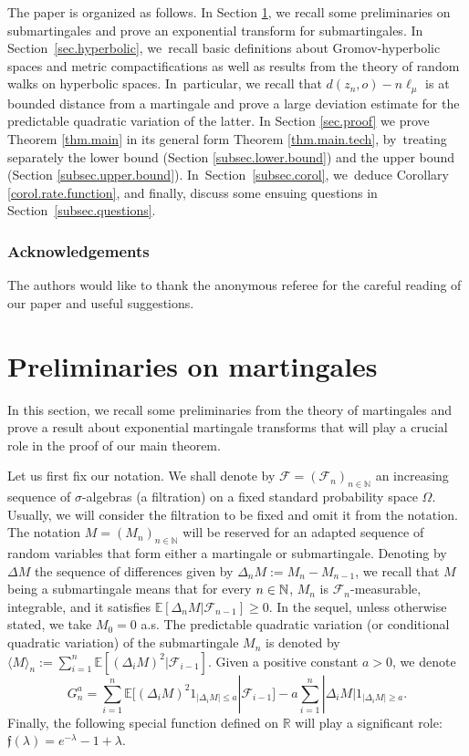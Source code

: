 \documentclass[JEP,XML,SOM,Unicode,published]{cedram}
\theoremstyle{plain}
\theoremstyle{definition}
\newcommand\R{\mathbb{R}}
\newcommand\N{\mathbb{N}}
\begin{document}
The paper is organized as follows. In Section \ref{sec.martingale}, we recall some preliminaries on submartingales and prove an exponential transform for submartingales. In Section~\ref{sec.hyperbolic}, we~recall basic definitions about Gromov-hyperbolic spaces and metric compactifications as well as results from the theory of random walks on hyperbolic spaces. In~particular, we recall that $d(z_n, o) -n\ell_{\mu}$ is at bounded distance from a martingale and prove a large deviation estimate for the predictable quadratic variation of the latter. In Section \ref{sec.proof} we prove Theorem \ref{thm.main} in its general form Theorem \ref{thm.main.tech}, by~treating separately the lower bound (Section \ref{subsec.lower.bound}) and the upper bound (Section \ref{subsec.upper.bound}). In~Section~\ref{subsec.corol}, we~deduce Corollary \ref{corol.rate.function}, and finally, discuss some ensuing questions in Section~\ref{subsec.questions}.

\subsubsection*{Acknowledgements}
The authors would like to thank the anonymous referee for the careful reading of our paper and useful suggestions.

\section{Preliminaries on martingales}\label{sec.martingale}

In this section, we recall some preliminaries from the theory of martingales and prove a result about exponential martingale transforms that will play a crucial role in the proof of our main theorem.

Let us first fix our notation. We shall denote by $\mathcal{F}=(\mathcal{F}_n)_{n\in \N}$ an increasing sequence of $\sigma$-algebras (a filtration) on a fixed standard probability space $\Omega$. Usually, we will consider the filtration to be fixed and omit it from the notation. The notation $M=(M_n)_{n \in \N}$ will be reserved for an adapted sequence of random variables that form either a martingale or submartingale. Denoting by $\Delta M$ the sequence of differences given by $\Delta_n M:=M_n-M_{n-1}$, we recall that $M$ being a submartingale means that for every $n\in\nobreak \N$, $M_n$ is $\mathcal{F}_n$-measurable, integrable, and it satisfies \hbox{$\mathbb{E}[\Delta_n M | \mathcal{F}_{n-1}] \geq 0$}. In the sequel, unless otherwise stated, we take $M_0=0$ a.s. The predictable quadratic variation (or conditional quadratic variation) of the submartingale $M_n$ is denoted by $\langle M\rangle_n:= \sum_{i=1}^n \mathbb{E}[(\Delta_i M)^2|\mathcal{F}_{i-1}]$. Given a positive constant $a>0$, we denote
\begin{equation}\label{transform.G}
G_n^a=\sum_{i=1}^n \mathbb{E}[(\Delta_i M)^2 1_{|\Delta_i M| \leq a}| \mathcal{F}_{i-1}]-a \sum_{i=1}^n |\Delta_i M| 1_{|\Delta_i M| \geq a}.\end{equation} Finally, the following special function defined on $\R$ will play a significant role: $\mathfrak{f}(\lambda)=e^{-\lambda} -1 +\lambda$.\vspace*{-3pt}
\end{document}
